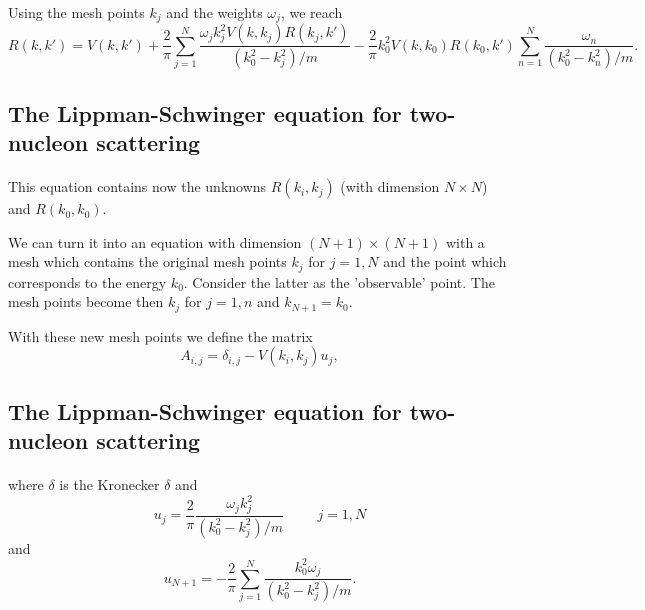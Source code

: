 \documentclass[%
twoside,                 %
final,                   %
10pt]{article}
\begin{document}
Using the mesh points $k_j$ and the weights $\omega_j$,
         we reach
\[
          R(k,k') = V(k,k') +\frac{2}{\pi}
          \sum_{j=1}^N\frac{\omega_jk_j^2V(k,k_j)R(k_j,k')}
                           {(k_0^2-k_j^2)/m}
           -\frac{2}{\pi}k_0^2V(k,k_0)R(k_0,k')
          \sum_{n=1}^N\frac{\omega_n}
                           {(k_0^2-k_n^2)/m}.                
\]



\subsection*{The Lippman-Schwinger equation for two-nucleon scattering}

\paragraph{}
This equation contains now the unknowns $R(k_i,k_j)$
(with dimension $N\times N$) and $R(k_0,k_0)$.

We can turn it into an equation
with dimension $(N+1)\times (N+1)$ with  a mesh
which contains the original mesh points $k_j$ for $j=1,N$
and the point which corresponds to the energy $k_0$.
Consider the latter as the 'observable' point.
The mesh points become then $k_j$ for $j=1,n$ and
$k_{N+1}=k_0$. 

With these new mesh points we define the matrix
\begin{equation}
      A_{i,j}=\delta_{i,j}-V(k_i,k_j)u_j,
      \label{eq:aeq}
\end{equation}



\subsection*{The Lippman-Schwinger equation for two-nucleon scattering}

\paragraph{}
where $\delta$ is the Kronecker $\delta$
and
\[
     u_j=\frac{2}{\pi}\frac{\omega_jk_j^2}{(k_0^2-k_j^2)/m}\hspace{1cm} j=1,N
\]
and
\[
     u_{N+1}=-\frac{2}{\pi}\sum_{j=1}^N\frac{k_0^2\omega_j}{(k_0^2-k_j^2)/m}.
\]
\end{document}
